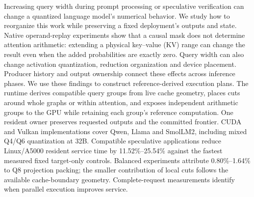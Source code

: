 Increasing query width during prompt processing or speculative verification can change a quantized language model's numerical behavior. We study how to reorganize this work while preserving a fixed deployment's outputs and state. Native operand-replay experiments show that a causal mask does not determine attention arithmetic: extending a physical key--value (KV) range can change the result even when the added probabilities are exactly zero. Query width can also change activation quantization, reduction organization and device placement. Producer history and output ownership connect these effects across inference phases. We use these findings to construct reference-derived execution plans. The runtime derives compatible query groups from live cache geometry, places cuts around whole graphs or within attention, and exposes independent arithmetic groups to the GPU while retaining each group's reference computation. One resident owner preserves requested outputs and the committed frontier. CUDA and Vulkan implementations cover Qwen, Llama and SmolLM2, including mixed Q4/Q6 quantization at 32B. Compatible speculative applications reduce Linux/A5000 resident service time by 11.52\%--25.54\% against the fastest measured fixed target-only controls. Balanced experiments attribute 0.80\%--1.64\% to Q8 projection packing; the smaller contribution of local cuts follows the available cache-boundary geometry. Complete-request measurements identify when parallel execution improves service.
